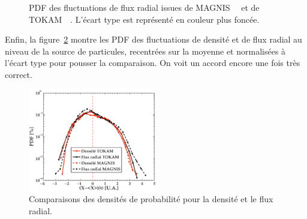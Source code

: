 \begin{refsection}
\begin{figure}[!htb]
  \centering
    \caption{PDF des fluctuations de
    flux radial issues de MAGNIS~~ et de 
    TOKAM~~. L'écart type est représenté en couleur plus
    foncée.}
    \label{4-TokamPdfFlux}
\end{figure}

Enfin, la figure~\ref{4-TokamPDFDensite} montre les PDF des fluctuations de densité
et de flux radial au niveau de la source de particules, recentrées
sur la moyenne et normalisées à l'écart type pour pousser la comparaison. On
voit un accord encore une fois très correct.

 \begin{figure}[!htbp]
\centering
\includegraphics[width=0.5\textwidth]{figures/4-TokamPDFDensite.eps}
{\caption{Comparaisons des densités de probabilité pour la densité et
le flux radial.}
\label{4-TokamPDFDensite}}
\end{figure}


\end{refsection}
